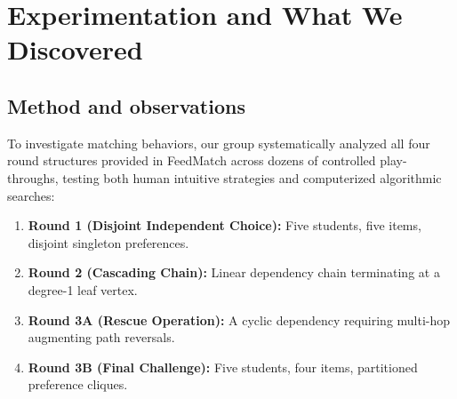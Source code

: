 \documentclass[11pt,a4paper]{article}
\begin{document}
\newpage
\section{Experimentation and What We Discovered}

\subsection{Method and observations}
To investigate matching behaviors, our group systematically analyzed all four round structures provided in FeedMatch across dozens of controlled play-throughs, testing both human intuitive strategies and computerized algorithmic searches:

\begin{enumerate}
  \item \textbf{Round 1 (Disjoint Independent Choice):} Five students, five items, disjoint singleton preferences.
  \item \textbf{Round 2 (Cascading Chain):} Linear dependency chain terminating at a degree-1 leaf vertex.
  \item \textbf{Round 3A (Rescue Operation):} A cyclic dependency requiring multi-hop augmenting path reversals.
  \item \textbf{Round 3B (Final Challenge):} Five students, four items, partitioned preference cliques.
\end{enumerate}
\end{document}
